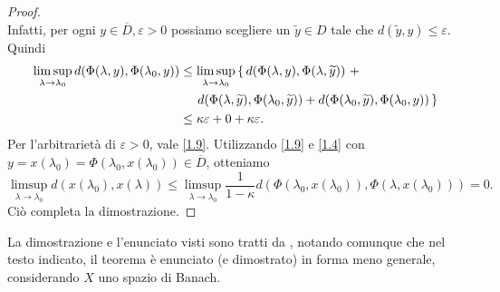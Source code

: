 \begin{proof}
\begin{equation}
\end{equation}
Infatti, per ogni $y\in\overline{D}, \varepsilon >0$ possiamo scegliere un $\widetilde{y}\in D$ tale che $d(\widetilde{y}, y)\leq\varepsilon$. Quindi
\begin{align*}
\limsup_{\lambda\rightarrow\lambda_{0}}d(\Phi(\lambda,y), \Phi(\lambda_{0},y))
& \leq \limsup_{\lambda\rightarrow\lambda_{0}}\,\{ \, 
d(\Phi(\lambda,y), \Phi(\lambda,\widetilde{y})) \ + \\
& \hspace{0.5cm} d(\Phi(\lambda,\widetilde{y}), \Phi(\lambda_{0},\widetilde{y})) + 
d(\Phi(\lambda_{0},\widetilde{y}), \Phi(\lambda_{0},y)) \, \}\\
& \leq \kappa\varepsilon + 0 + \kappa\varepsilon.
\end{align*}
Per l'arbitrarietà di $\varepsilon >0$, vale \eqref{1.9}. Utilizzando \eqref{1.9} e \eqref{1.4} con $y = x(\lambda_{0})=\Phi(\lambda_{0},x(\lambda_{0}))\in\overline{D}$, otteniamo
$$
\limsup_{\lambda\rightarrow\lambda_{0}}d(x(\lambda_{0}), x(\lambda))
\leq \limsup_{\lambda\rightarrow\lambda_{0}}\frac{1}{1-\kappa}d(\Phi(\lambda_{0},x(\lambda_{0})), \Phi(\lambda,x(\lambda_{0}))) = 0.
$$
Ciò completa la dimostrazione.
\end{proof}
La dimostrazione e l'enunciato visti sono tratti da \cite{bressan_2000}, notando comunque che nel testo indicato, il teorema è enunciato (e dimostrato) in forma meno generale, considerando $X$ uno spazio di Banach. 


